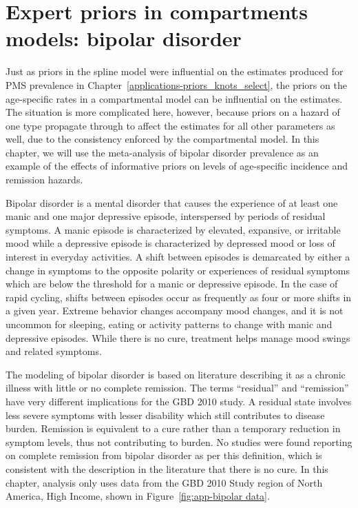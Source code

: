 \chapter{Expert priors in compartments models: bipolar disorder}
\label{applications-prior_level_vals}

Just as priors in the spline model were influential on the estimates
produced for PMS prevalence in
Chapter~\ref{applications-priors_knots_select}, the priors on the
age-specific rates in a compartmental model can be influential on the
estimates.  The situation is more complicated here, however, because
priors on a hazard of one type propagate through to affect the
estimates for all other parameters as well, due to the consistency
enforced by the compartmental model.  In this chapter, we will use the
meta-analysis of bipolar disorder prevalence as an example of the
effects of informative priors on levels of age-specific incidence and
remission hazards.

Bipolar disorder is a mental disorder that causes the experience
of at least one manic and one major depressive episode,
interspersed by periods of residual symptoms.  A manic episode is
characterized by elevated, expansive, or irritable mood while a
depressive episode is characterized by depressed mood or loss of
interest in everyday activities.  A shift between episodes is
demarcated by either a change in symptoms to the opposite polarity
or experiences of residual symptoms which are below the threshold
for a manic or depressive episode.  In the case of rapid cycling,
shifts between episodes occur as frequently as four or more shifts
in a given year.  Extreme behavior
changes accompany mood changes, and it is not uncommon for sleeping,
eating or activity patterns to change with manic and depressive
episodes.
While there
is no cure, treatment helps manage mood swings and related
symptoms. \cite{kloos_bipolar_2011, angst_historical_2000, TK_coauthor_ref}

The modeling of bipolar disorder is based on literature describing it
as a chronic illness with little or no complete remission.
The terms ``residual'' and ``remission'' have very different implications
for the GBD 2010 study.  A residual state involves less severe
symptoms with lesser disability which still contributes to disease
burden.  Remission is equivalent to a cure rather than a temporary
reduction in symptom levels, thus not contributing to burden.  No studies
were found reporting on complete remission from bipolar disorder as per this definition,
which is consistent with the description in the literature that there
is no cure. \cite{american_psychiatric_association_diagnostic_2000}
In this chapter, analysis
only uses data from the GBD 2010 Study region of North America, High Income,
shown in Figure~\ref{fig:app-bipolar data}.

